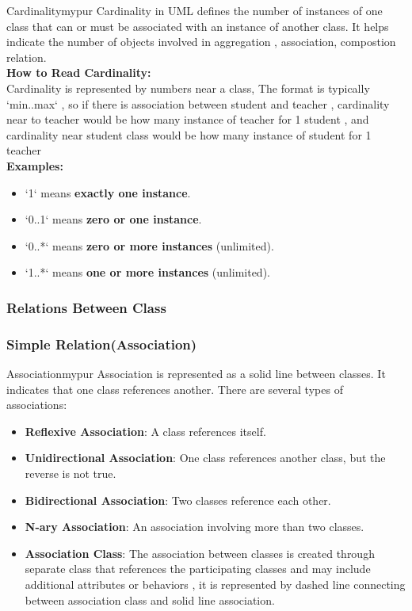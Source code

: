 \begin{prettyBox}{Cardinality}{mypur}
Cardinality in UML defines the number of instances of one class that can or must be associated with an instance of another class. It helps indicate the number of objects involved in aggregation , association, compostion relation.\\[0.25cm]
\textbf{How to Read Cardinality:}\\[0.15cm]
Cardinality is represented by numbers near a class, The format is typically `min..max` , so if there is association
between student and teacher , cardinality near to teacher would be how many instance of teacher for 1 student , and cardinality near
student class would be how many instance of student for 1 teacher\\[0.25cm]  
\textbf{Examples:}
\begin{itemize}
    \item `1` means \textbf{exactly one instance}. 
    \item `0..1` means \textbf{zero or one instance}.
    \item `0..*` means \textbf{zero or more instances} (unlimited).
    \item `1..*` means \textbf{one or more instances} (unlimited).
\end{itemize}


\end{prettyBox}

\subsubsection{Relations Between Class}


\subsubsection*{Simple Relation(Association)}
\begin{prettyBox}{Association}{mypur}
Association is represented as a solid line between classes. It indicates that one class references another. There are several types of associations:
\begin{itemize}
    \item \textbf{Reflexive Association}: A class references itself.
    \item \textbf{Unidirectional Association}: One class references another class, but the reverse is not true.
    \item \textbf{Bidirectional Association}: Two classes reference each other.
    \item \textbf{N-ary Association}: An association involving more than two classes.
    \item \textbf{Association Class}: The association between classes is created through separate class that references the participating classes and may include additional attributes or behaviors ,  it is represented by dashed line 
connecting between association class and solid line association.
\end{itemize}
\end{prettyBox}

